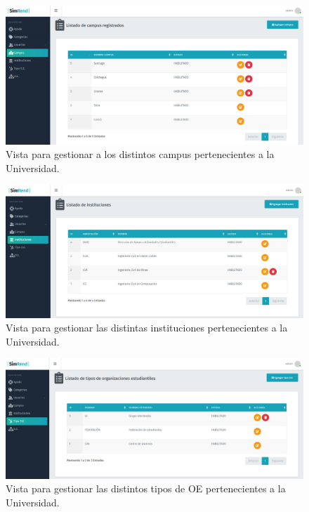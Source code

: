 \begin{figure}[h]
    \centering
    \includegraphics[width=1\textwidth]{Imagenes/CRUDCampus.PNG}
    \caption{\label{fig: CRUDCampus}Vista para gestionar a los distintos campus pertenecientes a la Universidad.}
\end{figure}

\begin{figure}[h]
    \centering
    \includegraphics[width=1\textwidth]{Imagenes/CRUDInstituciones.PNG}
    \caption{\label{fig: CRUDInstituciones}Vista para gestionar las distintas instituciones pertenecientes a la Universidad.}
\end{figure}

\begin{figure}[h]
    \centering
    \includegraphics[width=1\textwidth]{Imagenes/CRUDTipoOE.PNG}
    \caption{\label{fig: CRUDTipoOE}Vista para gestionar las distintos tipos de OE pertenecientes a la Universidad.}
\end{figure}


